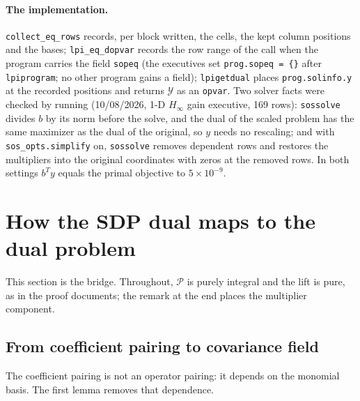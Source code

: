 \documentclass[12pt]{article}
\newcommand{\mcl}[1]{\mathcal{#1}}
\newcommand{\code}[1]{\texttt{#1}}
\theoremstyle{plain}
\theoremstyle{definition}
\theoremstyle{remark}
\begin{document}
\paragraph{The implementation.} \code{collect\_eq\_rows} records, per block written, the cells, the kept column positions and the bases; \code{lpi\_eq\_dopvar} records the row range of the call when the program carries the field \code{sopeq} (the executives set \code{prog.sopeq = \{\}} after \code{lpiprogram}; no other program gains a field); \code{lpigetdual} places \code{prog.solinfo.y} at the recorded positions and returns $\mcl Y$ as an \code{opvar}. Two solver facts were checked by running (10/08/2026, 1-D $H_\infty$ gain executive, 169 rows): \code{sossolve} divides $b$ by its norm before the solve, and the dual of the scaled problem has the same maximizer as the dual of the original, so $y$ needs no rescaling; and with \code{sos\_opts.simplify} on, \code{sossolve} removes dependent rows and restores the multipliers into the original coordinates with zeros at the removed rows. In both settings $b^Ty$ equals the primal objective to $5\times10^{-9}$.

\section{How the SDP dual maps to the dual problem}\label{sec:map}

This section is the bridge. Throughout, $\mcl P$ is purely integral and the lift is pure, as in the proof documents; the remark at the end places the multiplier component.

\subsection{From coefficient pairing to covariance field}

The coefficient pairing is not an operator pairing: it depends on the monomial basis. The first lemma removes that dependence.
\end{document}
